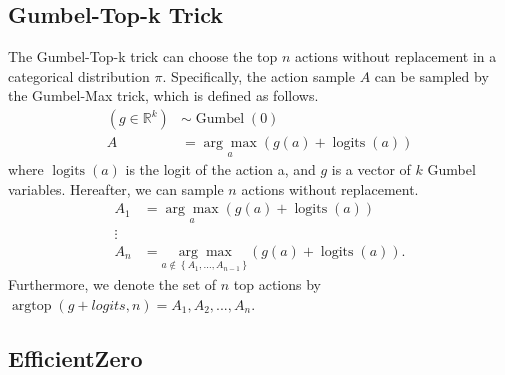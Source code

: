 \subsection{Gumbel-Top-k Trick}
\label{main_gumbel_topk}
The Gumbel-Top-k trick \citep{kool2019stochastic} can choose the top $n$ actions without replacement in a categorical distribution $\pi$. Specifically, the action sample $A$ can be sampled by the Gumbel-Max trick, which is defined as follows.
\begin{equation}
\begin{aligned}
\left(g \in \mathbb{R}^k\right) & \sim \operatorname{Gumbel}(0) \\
A & =\underset{a}{\arg \max }(g(a)+\operatorname{logits}(a)) 
\end{aligned}
\end{equation}
where $\operatorname{logits}(a)$ is the logit of the action a, and $g$ is a vector of $k$ Gumbel variables. Hereafter, we can sample $n$ actions without replacement. 
\begin{equation}
\begin{aligned}
A_1 & =\underset{a}{\arg \max }(g(a)+\operatorname{logits}(a)) \\
\vdots & \\
A_n & =\underset{a \notin\left\{A_1, \ldots, A_{n-1}\right\}}{\arg \max }(g(a)+\operatorname{logits}(a)) .
\end{aligned}
\end{equation}
Furthermore, we denote the set of $n$ top actions by $\operatorname{argtop}(g + logits, n) = {A_1, A_2,..., A_n}$.



\subsection{EfficientZero}

